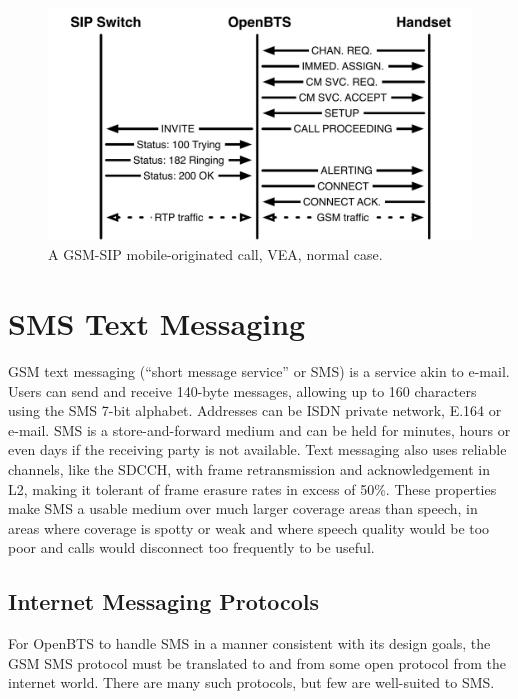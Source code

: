 \documentclass[11pt,openany]{book}
\begin{document}
\begin{figure}[htbp]
\begin{center}
\includegraphics[width=6in]{MOCLadder.pdf}
\caption{A GSM-SIP mobile-originated call, VEA, normal case.}
\label{fig:MOCLadder}
\end{center}
\end{figure}







\chapter{SMS Text Messaging}
\label{chap:smqueue}
GSM text messaging (``short message service'' or SMS) is a service akin to e-mail.
Users can send and receive 140-byte messages, allowing up to 160 characters using the SMS 7-bit alphabet.
Addresses can be ISDN private network, E.164 or e-mail.
SMS is a store-and-forward medium and can be held for minutes, hours or even days if the receiving party is not available.
Text messaging also uses reliable channels, like the SDCCH, with frame retransmission and acknowledgement in L2, making it tolerant of frame erasure rates in excess of 50\%.
These properties make SMS a usable medium over much larger coverage areas than speech, in areas where coverage is spotty or weak and where speech quality would be too poor and calls would disconnect too frequently to be useful.

\section{Internet Messaging Protocols}
For OpenBTS to handle SMS in a manner consistent with its design goals, the GSM SMS protocol must be translated to and from some open protocol from the internet world.
There are many such protocols, but few are well-suited to SMS.
\end{document}
